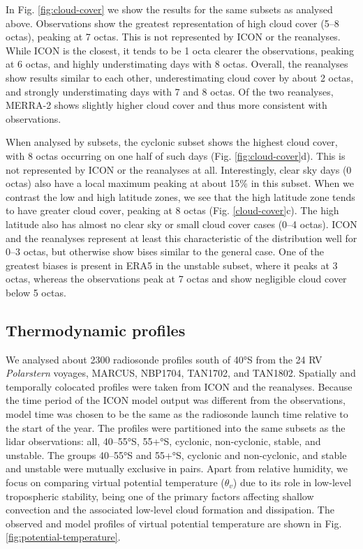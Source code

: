 \documentclass[12pt,a4paper]{article}
\begin{document}
In Fig.  \ref{fig:cloud-cover} we show the results for the same subsets as
analysed above. Observations show the greatest representation of high cloud
cover (5--8 octas), peaking at 7 octas. This is not represented by ICON or the
reanalyses.  While ICON is the closest, it tends to be 1 octa clearer the
observations, peaking at 6 octas, and highly understimating days with 8 octas.
Overall, the reanalyses show results similar to each other, underestimating
cloud cover by about 2 octas, and strongly understimating days with 7 and 8
octas. Of the two reanalyses, MERRA-2 shows slightly higher cloud cover and
thus more consistent with observations.

When analysed by subsets, the cyclonic subset shows the highest cloud cover,
with 8 octas occurring on one half of such days (Fig. \ref{fig:cloud-cover}d).
This is not represented by ICON or the reanalyses at all. Interestingly, clear
sky days (0 octas) also have a local maximum peaking at about 15\% in this
subset.  When we contrast the low and high latitude zones, we see that the high
latitude zone tends to have greater cloud cover, peaking at 8 octas (Fig.
\ref{cloud-cover}c). The high latitude also has almost no clear sky or small
cloud cover cases (0--4 octas). ICON and the reanalyses represent at least this
characteristic of the distribution well for 0--3 octas, but otherwise show
bises similar to the general case. One of the greatest biases is present in
ERA5 in the unstable subset, where it peaks at 3 octas, whereas the
observations peak at 7 octas and show negligible cloud cover below 5 octas.

\subsection{Thermodynamic proﬁles}

We analysed about 2300 radiosonde proﬁles south of 40°S from the 24 RV
\emph{Polarstern} voyages, MARCUS, NBP1704, TAN1702, and TAN1802. Spatially and
temporally colocated profiles were taken from ICON and the reanalyses. Because
the time period of the ICON model output was different from the observations,
model time was chosen to be the same as the radiosonde launch time relative to
the start of the year. The profiles were partitioned into the same subsets as
the lidar observations: all, 40--55°S, 55+°S, cyclonic, non-cyclonic, stable,
and unstable. The groups 40--55°S and 55+°S, cyclonic and non-cyclonic, and
stable and unstable were mutually exclusive in pairs. Apart from relative
humidity, we focus on comparing virtual potential temperature ($\theta_v$) due
to its role in low-level tropospheric stability, being one of the primary
factors affecting shallow convection and the associated low-level cloud
formation and dissipation. The observed and model profiles of virtual potential
temperature are shown in Fig. \ref{fig:potential-temperature}.
\end{document}
